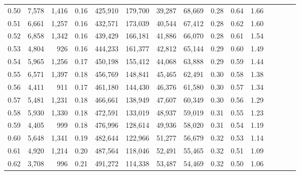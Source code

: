 \begin{tabular}{rrrcrrrrrrrrrrr}
0.50 &   7,578 &   1,416 &                                       0.16 &  425,910 &  179,700 &   39,287 &   68,669 &  0.28 &  0.64 &                         1.66 \\
0.51 &   6,661 &   1,257 &                                       0.16 &  432,571 &  173,039 &   40,544 &   67,412 &  0.28 &  0.62 &                         1.60 \\
0.52 &   6,858 &   1,342 &                                       0.16 &  439,429 &  166,181 &   41,886 &   66,070 &  0.28 &  0.61 &                         1.54 \\
0.53 &   4,804 &     926 &                                       0.16 &  444,233 &  161,377 &   42,812 &   65,144 &  0.29 &  0.60 &                         1.49 \\
0.54 &   5,965 &   1,256 &                                       0.17 &  450,198 &  155,412 &   44,068 &   63,888 &  0.29 &  0.59 &                         1.44 \\
0.55 &   6,571 &   1,397 &                                       0.18 &  456,769 &  148,841 &   45,465 &   62,491 &  0.30 &  0.58 &                         1.38 \\
0.56 &   4,411 &     911 &                                       0.17 &  461,180 &  144,430 &   46,376 &   61,580 &  0.30 &  0.57 &                         1.34 \\
0.57 &   5,481 &   1,231 &                                       0.18 &  466,661 &  138,949 &   47,607 &   60,349 &  0.30 &  0.56 &                         1.29 \\
0.58 &   5,930 &   1,330 &                                       0.18 &  472,591 &  133,019 &   48,937 &   59,019 &  0.31 &  0.55 &                         1.23 \\
0.59 &   4,405 &     999 &                                       0.18 &  476,996 &  128,614 &   49,936 &   58,020 &  0.31 &  0.54 &                         1.19 \\
0.60 &   5,648 &   1,341 &                                       0.19 &  482,644 &  122,966 &   51,277 &   56,679 &  0.32 &  0.53 &                         1.14 \\
0.61 &   4,920 &   1,214 &                                       0.20 &  487,564 &  118,046 &   52,491 &   55,465 &  0.32 &  0.51 &                         1.09 \\
0.62 &   3,708 &     996 &                                       0.21 &  491,272 &  114,338 &   53,487 &   54,469 &  0.32 &  0.50 &                         1.06 \\

\end{tabular}
